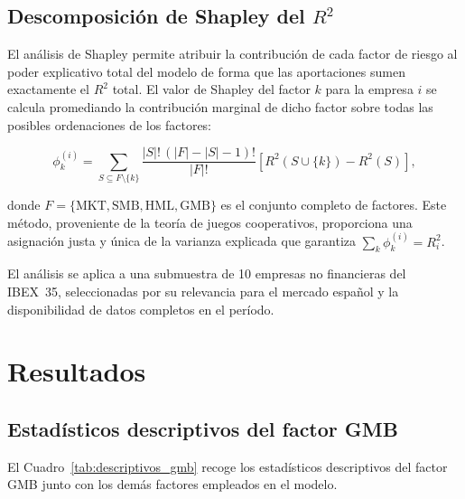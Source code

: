 \documentclass[12pt, a4paper]{article}
\begin{document}
\subsection{Descomposici\'on de Shapley del $R^2$}
\label{subsec:shapley}

El an\'alisis de Shapley permite atribuir la contribuci\'on de cada factor de riesgo
al poder explicativo total del modelo de forma que las aportaciones sumen exactamente
el $R^2$ total. El valor de Shapley del factor $k$ para la empresa $i$ se calcula
promediando la contribuci\'on marginal de dicho factor sobre todas las posibles
ordenaciones de los factores:

\begin{equation}
  \label{eq:shapley}
  \phi_k^{(i)} = \sum_{S \subseteq F \setminus \{k\}}
    \frac{|S|!\,(|F|-|S|-1)!}{|F|!}
    \left[ R^2(S \cup \{k\}) - R^2(S) \right],
\end{equation}

donde $F = \{\mathrm{MKT}, \mathrm{SMB}, \mathrm{HML}, \mathrm{GMB}\}$ es el conjunto
completo de factores. Este m\'etodo, proveniente de la teor\'ia de juegos cooperativos,
proporciona una asignaci\'on justa y \'unica de la varianza explicada que garantiza
$\sum_k \phi_k^{(i)} = R^2_i$.

El an\'alisis se aplica a una submuestra de 10 empresas no financieras del IBEX~35,
seleccionadas por su relevancia para el mercado espa\~nol y la disponibilidad de datos
completos en el per\'iodo.

\section{Resultados}
\label{sec:resultados}

\subsection{Estad\'isticos descriptivos del factor GMB}
\label{subsec:descr_gmb}

El Cuadro~\ref{tab:descriptivos_gmb} recoge los estad\'isticos descriptivos del factor
GMB junto con los dem\'as factores empleados en el modelo.
\end{document}
